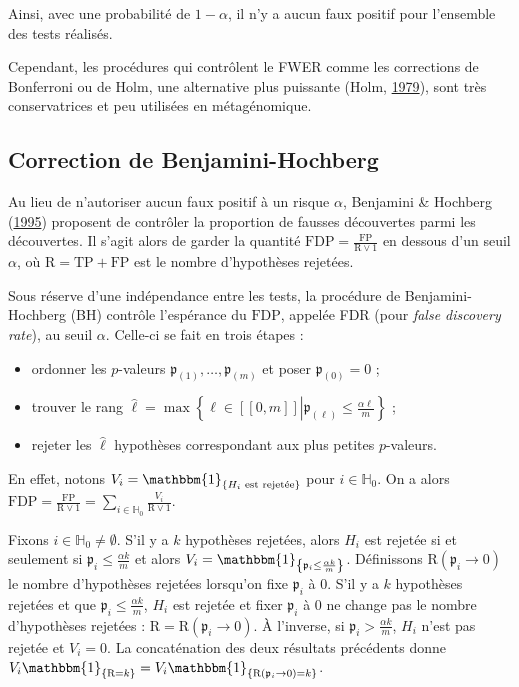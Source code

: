 \documentclass[12pt,a4paper]{reedthesis}
\newcommand \indic {\mathbbm{1}}
\newcommand \pv {\mathfrak{p}}
\theoremstyle{definition}
\theoremstyle{definition}
\theoremstyle{definition}
\theoremstyle{remark}
\begin{document}
Ainsi, avec une probabilité de \(1-\alpha\), il n'y a aucun faux positif pour l'ensemble des tests réalisés.

Cependant, les procédures qui contrôlent le FWER comme les corrections de Bonferroni ou de Holm, une alternative plus puissante (Holm, \protect\hyperlink{ref-holm1979simple}{1979}), sont très conservatrices et peu utilisées en métagénomique.

\hypertarget{correction-de-benjamini-hochberg}{%
\subsection{Correction de Benjamini-Hochberg}\label{correction-de-benjamini-hochberg}}

Au lieu de n'autoriser aucun faux positif à un risque \(\alpha\), Benjamini \& Hochberg (\protect\hyperlink{ref-benjamini1995controlling}{1995}) proposent de contrôler la proportion de fausses découvertes parmi les découvertes. Il s'agit alors de garder la quantité \(\text{FDP} = \frac{\text{FP}}{\text{R} \vee 1}\) en dessous d'un seuil \(\alpha\), où \(\text{R} = \text{TP} + \text{FP}\) est le nombre d'hypothèses rejetées.

Sous réserve d'une indépendance entre les tests, la procédure de Benjamini-Hochberg (BH) contrôle l'espérance du \(\text{FDP}\), appelée FDR (pour \emph{false discovery rate}), au seuil \(\alpha\). Celle-ci se fait en trois étapes :
\begin{itemize}
\item
  ordonner les \(p\)-valeurs \(\pv_{(1)}, \ldots, \pv_{(m)}\) et poser \(\pv_{(0)} = 0\) ;
\item
  trouver le rang \(\hat{\ell} = \max\left\{\ell \in [\![0,m]\!] \left| \pv_{(\ell)} \leq \frac{\alpha\ell}{m} \right. \right\}\) ;
\item
  rejeter les \(\hat{\ell}\) hypothèses correspondant aux plus petites \(p\)-valeurs.
\end{itemize}
En effet, notons \(V_i = \indic_{\left\{H_i \text{ est rejetée}\right\}}\) pour \(i \in \mathbb{H}_0\). On a alors
\(\text{FDP} = \frac{\text{FP}}{\text{R} \vee 1} = \sum_{i\in \mathbb{H}_0} \frac{V_i}{\text{R} \vee 1}\).

Fixons \(i\in \mathbb{H}_0 \neq \emptyset\). S'il y a \(k\) hypothèses rejetées, alors \(H_i\) est rejetée si et seulement si \(\pv_i \leq \frac{\alpha k}{m}\) et alors \(V_i = \indic_{\left\{\pv_i \leq \frac{\alpha k}{m}\right\}}\). Définissons \(\text{R}(\pv_i \rightarrow 0)\) le nombre d'hypothèses rejetées lorsqu'on fixe \(\pv_i\) à \(0\). S'il y a \(k\) hypothèses rejetées et que \(\pv_i \leq \frac{\alpha k}{m}\), \(H_i\) est rejetée et fixer \(\pv_i\) à \(0\) ne change pas le nombre d'hypothèses rejetées : \(\text{R} = \text{R}(\pv_i \rightarrow 0)\). À l'inverse, si \(\pv_i > \frac{\alpha k}{m}\), \(H_i\) n'est pas rejetée et \(V_i = 0\). La concaténation des deux résultats précédents donne \(V_i\indic_{\left\{\text{R}=k\right\}} = V_i\indic_{\left\{\text{R}(\pv_i \rightarrow 0) = k\right\}}\).
\end{document}

